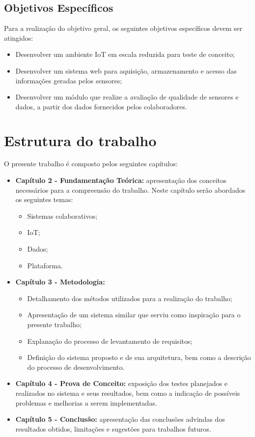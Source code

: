\subsection{Objetivos Específicos}
Para a realização do objetivo geral, os seguintes objetivos específicos devem ser atingidos:
\begin{itemize}
  \item Desenvolver um ambiente \acrshort{IoT} em escala reduzida para teste de conceito;
  \item Desenvolver um sistema web para aquisição, armazenamento e acesso das informações geradas pelos sensores;
  \item Desenvolver um módulo que realize a avaliação de qualidade de sensores e dados, a partir dos dados fornecidos pelos colaboradores.
\end{itemize}
\section{Estrutura do trabalho}
O presente trabalho é composto pelos seguintes capítulos:
\begin{itemize}
  \item \textbf{Capítulo 2 - Fundamentação Teórica:} apresentação dos conceitos necessários para a compreensão do
  trabalho. Neste capítulo serão abordados os seguintes temas:
  \begin{itemize}
    \item Sistemas colaborativos;
    \item \acrlong{IoT};
    \item Dados;
    \item Plataforma.
  \end{itemize}
  \item \textbf{Capítulo 3 - Metodologia:}
\begin{itemize}
  \item Detalhamento dos métodos utilizados para a realização do trabalho;
  \item Apresentação de um sistema similar que serviu como inspiração para o presente trabalho;
  \item Explanação do processo de levantamento de requisitos;
  \item Definição do sistema proposto e de sua arquitetura, bem como a descrição do processo de desenvolvimento.
\end{itemize}
  \item \textbf{Capítulo 4 - Prova de Conceito:} exposição dos testes planejados e realizados no sistema e seus resultados, bem como a indicação de possíveis problemas e melhorias a serem implementadas.
  \item \textbf{Capítulo 5 - Conclusão:} apresentação das conclusões advindas dos resultados obtidos, limitações e
  sugestões para trabalhos futuros.
\end{itemize}
